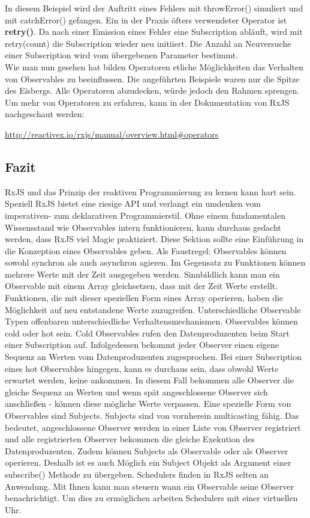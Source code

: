 \noindent
In diesem Beispiel wird der Auftritt eines Fehlers mit throwError() simuliert und mit catchError() gefangen. Ein in der Praxis öfters verwendeter Operator ist \textbf{retry()}. Da nach einer Emission eines Fehler eine Subscription abläuft, wird mit retry(count) die Subscription wieder neu initiiert. Die Anzahl an Neuversuche einer Subscription wird vom übergebenen Parameter bestimmt.\\

\noindent
Wie man nun gesehen hat bilden Operatoren etliche Möglichkeiten das Verhalten von Observables zu beeinflussen. Die angeführten Beispiele waren nur die Spitze des Eisbergs. Alle Operatoren abzudecken, würde jedoch den Rahmen sprengen. Um mehr von Operatoren zu erfahren, kann in der Dokumentation von RxJS nachgeschaut werden:

\begin{center}
\url{http://reactivex.io/rxjs/manual/overview.html#operators} 
\end{center}


\subsection{Fazit}
RxJS und das Prinzip der reaktiven Programmierung zu lernen kann hart sein. Speziell RxJS bietet eine riesige API und verlangt ein umdenken vom imperativen- zum deklarativen Programmierstil. Ohne einem fundamentalen Wissensstand wie Observables intern funktionieren, kann durchaus gedacht werden, dass RxJS viel \glqq Magie\grqq{} praktiziert. Diese Sektion sollte eine Einführung in die Konzeption eines Observables geben. Als Faustregel: Observables können sowohl synchron als auch asynchron agieren. Im Gegensatz zu Funktionen können mehrere Werte mit der Zeit ausgegeben werden. Sinnbildlich kann man ein Observable mit einem Array gleichsetzen, dass mit der Zeit Werte erstellt. Funktionen, die mit dieser speziellen Form eines Array operieren, haben die Möglichkeit auf neu entstandene Werte zuzugreifen. Unterschiedliche Observable Typen offenbaren unterschiedliche Verhaltensmechanismen. Observables können cold oder hot sein. Cold Observables rufen den Datenproduzenten beim Start einer Subscription auf. Infolgedessen bekommt jeder Observer einen eigene Sequenz an Werten vom Datenproduzenten zugesprochen. Bei einer Subscription eines hot Observables hingegen, kann es durchaus sein, dass obwohl Werte erwartet werden, keine ankommen. In diesem Fall bekommen alle Observer die gleiche Sequenz an Werten und wenn spät angeschlossene Observer sich anschließen - können diese mögliche Werte verpassen. Eine spezielle Form von Observables sind Subjects. Subjects sind von vornherein multicasting fähig. Das bedeutet, angeschlossene Observer werden in einer Liste von Observer registriert und alle registrierten Observer bekommen die gleiche Exekution des Datenproduzenten. Zudem können Subjects als Observable oder als Observer operieren. Deshalb ist es auch Möglich ein Subject Objekt als Argument einer subscribe() Methode zu übergeben. Schedulers finden in RxJS selten an Anwendung. Mit Ihnen kann man steuern wann ein Observable seine Observer benachrichtigt. Um dies zu ermöglichen arbeiten Schedulers mit einer virtuellen Uhr.


